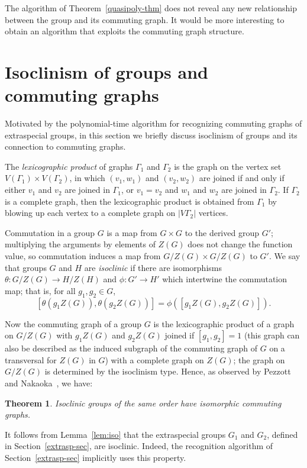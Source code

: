 \documentclass{elsarticle}
\newtheorem{theorem}{Theorem}[section]
\begin{document}
The algorithm of Theorem~\ref{quasipoly-thm} does not reveal any new
relationship between the group and its commuting graph. It would be
more interesting to obtain an algorithm that exploits the commuting
graph structure.

\section{Isoclinism of groups and commuting graphs}\label{sec-isoclin}

Motivated by the polynomial-time algorithm for recognizing commuting
graphs of extraspecial groups, in this section we briefly discuss
isoclinism of groups and its connection to commuting graphs.

The \emph{lexicographic product} of graphs $\Gamma_1$ and $\Gamma_2$ is the
graph on the vertex set $V(\Gamma_1)\times V(\Gamma_2)$, in which $(v_1,w_1)$
and $(v_2,w_2)$ are joined if and only if either $v_1$ and $v_2$ are joined in
$\Gamma_1$, or $v_1=v_2$ and $w_1$ and $w_2$ are joined in $\Gamma_2$. If
$\Gamma_2$ is a complete graph, then the lexicographic product is obtained
from $\Gamma_1$ by blowing up each vertex to a complete graph on
$|V\Gamma_2|$ vertices.

Commutation in a group $G$ is a map from $G\times G$ to the derived group $G'$;
multiplying the arguments by elements of $Z(G)$ does not change the function
value, so commutation induces a map from $G/Z(G)\times G/Z(G)$ to $G'$.
We say that groups $G$ and $H$ are \emph{isoclinic} if there are isomorphisms
$\theta:G/Z(G)\to H/Z(H)$ and $\phi:G'\to H'$ which intertwine the commutation
map; that is, for all $g_1,g_2\in G$,
\[[\theta(g_1Z(G)),\theta(g_2Z(G))]=\phi([g_1Z(G),g_2Z(G)]).\]

Now the commuting graph of a group $G$ is the lexicographic product of a
graph on $G/Z(G)$ with $g_1Z(G)$ and $g_2Z(G)$ joined if $[g_1,g_2]=1$
(this graph can also be described as the induced subgraph of the commuting
graph of $G$ on a transversal for $Z(G)$ in $G$)
with a complete graph on $Z(G)$; the graph on $G/Z(G)$ is determined by the
isoclinism type. Hence, as observed by Pezzott and Nakaoka~\cite{pn}, we have:

\begin{theorem}\label{thm:isoclin}
Isoclinic groups of the same order have isomorphic commuting graphs.
\end{theorem}

\begin{remark}
  It follows from Lemma~\ref{lem:iso} that the extraspecial groups
  $G_1$ and $G_2$, defined in Section~\ref{extrasp-sec}, are
  isoclinic. Indeed, the recognition algorithm of
  Section~\ref{extrasp-sec} implicitly uses this property.
\end{remark}
\end{document}
